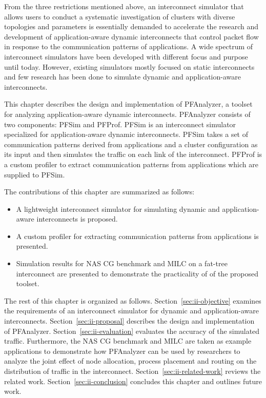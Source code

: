 From the three restrictions mentioned above, an interconnect simulator that
allows users to conduct a systematic investigation of clusters with diverse
topologies and parameters is essentially demanded to accelerate the research
and development of application-aware dynamic interconnects that control packet
flow in response to the communication patterns of applications. A wide
spectrum of interconnect simulators have been developed with different focus
and purpose until today. However, existing simulators mostly focused on static
interconnects and few research has been done to simulate dynamic and
application-aware interconnects.

This chapter describes the design and implementation of PFAnalyzer, a
toolset for analyzing application-aware dynamic interconnects.
PFAnalyzer consists of two components: PFSim and PFProf. PFSim is an
interconnect simulator specialized for application-aware dynamic
interconnects. PFSim takes a set of communication patterns derived from
applications and a cluster configuration as its input and then simulates the
traffic on each link of the interconnect. PFProf is a custom profiler to
extract communication patterns from applications which are supplied to PFSim.

The contributions of this chapter are summarized as follows:

\begin{itemize}
\item
  A lightweight interconnect simulator for simulating dynamic and
  application-aware interconnects is proposed.
\item
  A custom profiler for extracting communication patterns from
  applications is presented.
\item
  Simulation results for NAS CG benchmark and MILC on a fat-tree
  interconnect are presented to demonstrate the practicality of of the
  proposed toolset.
\end{itemize}

The rest of this chapter is organized as follows.
Section~\ref{sec:ii-objective} examines the requirements of an
interconnect simulator for dynamic and application-aware interconnects.
Section~\ref{sec:ii-proposal} describes the design and implementation of
PFAnalyzer. Section~\ref{sec:ii-evaluation} evaluates the accuracy of the
simulated traffic. Furthermore, the NAS CG benchmark and MILC are taken as
example applications to demonstrate how PFAnalyzer can be used by researchers
to analyze the joint effect of node allocation, process placement and routing
on the distribution of traffic in the interconnect.
Section~\ref{sec:ii-related-work} reviews the related work.
Section~\ref{sec:ii-conclusion} concludes this chapter and outlines future
work.

